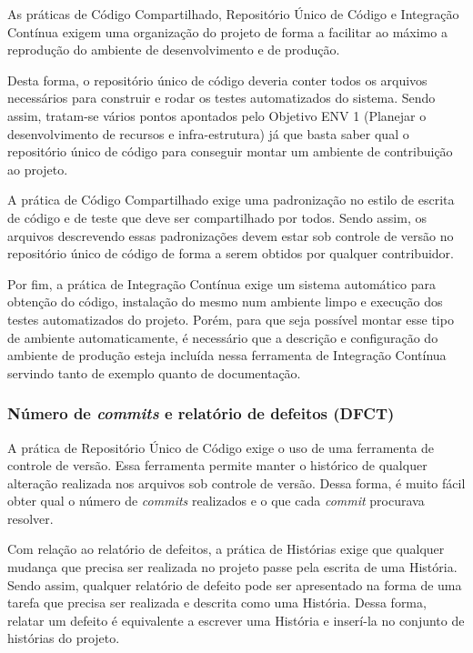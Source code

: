 As práticas de Código Compartilhado, Repositório Único de Código e
Integração Contínua exigem uma organização do projeto de forma a
facilitar ao máximo a reprodução do ambiente de desenvolvimento e de
produção.

Desta forma, o repositório único de código deveria conter todos os
arquivos necessários para construir e rodar os testes automatizados do
sistema. Sendo assim, tratam-se vários pontos apontados pelo Objetivo
ENV 1 (Planejar o desenvolvimento de recursos e infra-estrutura) já
que basta saber qual o repositório único de código para conseguir
montar um ambiente de contribuição ao projeto.

A prática de Código Compartilhado exige uma padronização no estilo de
escrita de código e de teste que deve ser compartilhado por
todos. Sendo assim, os arquivos descrevendo essas padronizações devem
estar sob controle de versão no repositório único de código de forma a
serem obtidos por qualquer contribuidor.

Por fim, a prática de Integração Contínua exige um sistema automático
para obtenção do código, instalação do mesmo num ambiente limpo e
execução dos testes automatizados do projeto. Porém, para que seja possível
montar esse tipo de ambiente automaticamente, é necessário que a
descrição e configuração do ambiente de produção esteja incluída nessa
ferramenta de Integração Contínua servindo tanto de exemplo quanto de
documentação.

\subsubsection{Número de \textit{commits} e relatório de defeitos
  (DFCT)}
\label{sec:+dfct}

A prática de Repositório Único de Código exige o uso de uma ferramenta
de controle de versão. Essa ferramenta permite manter o histórico de
qualquer alteração realizada nos arquivos sob controle de
versão. Dessa forma, é muito fácil obter qual o número de
\textit{commits} realizados e o que cada \textit{commit} procurava
resolver.

Com relação ao relatório de defeitos, a prática de Histórias exige que
qualquer mudança que precisa ser realizada no projeto passe pela
escrita de uma História. Sendo assim, qualquer relatório de defeito
pode ser apresentado na forma de uma tarefa que precisa ser realizada
e descrita como uma História. Dessa forma, relatar um defeito é
equivalente a escrever uma História e inserí-la no conjunto de
histórias do projeto.

